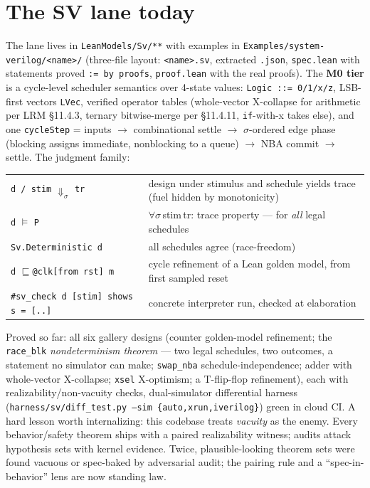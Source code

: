 \documentclass[10pt]{article}
\newcommand{\code}[1]{\texttt{#1}}
\begin{document}
\section{The SV lane today}
The lane lives in \code{LeanModels/Sv/**} with examples in
\code{Examples/system-verilog/<name>/} (three-file layout: \code{<name>.sv}, extracted
\code{.json}, \code{spec.lean} with statements proved \code{:= by proofs}, \code{proof.lean}
with the real proofs). The \textbf{M0 tier} is a cycle-level scheduler semantics over
4-state values: \code{Logic ::= 0/1/x/z}, LSB-first vectors \code{LVec}, verified operator
tables (whole-vector X-collapse for arithmetic per LRM \S11.4.3, ternary bitwise-merge per
\S11.4.11, \code{if}-with-x takes else), and one \code{cycleStep} = inputs $\to$
combinational settle $\to$ $\sigma$-ordered edge phase (blocking assigns immediate,
nonblocking to a queue) $\to$ NBA commit $\to$ settle. The judgment family:

\begin{center}\small
\begin{tabular}{@{}ll@{}}
\toprule
\code{d / stim} $\Downarrow_{\sigma}$ \code{tr} & design under stimulus and schedule yields trace (fuel hidden by monotonicity)\\
\code{d} $\vDash$ \code{P} & $\forall \sigma\,$stim$\,$tr: trace property --- for \emph{all} legal schedules\\
\code{Sv.Deterministic d} & all schedules agree (race-freedom) \\
\code{d} $\sqsubseteq$\code{@clk[from rst] m} & cycle refinement of a Lean golden model, from first sampled reset\\
\code{\#sv\_check d [stim] shows s = [..]} & concrete interpreter run, checked at elaboration \\
\bottomrule
\end{tabular}
\end{center}

Proved so far: all six gallery designs (counter golden-model refinement; the
\code{race\_blk} \emph{nondeterminism theorem} --- two legal schedules, two outcomes, a
statement no simulator can make; \code{swap\_nba} schedule-independence; adder with
whole-vector X-collapse; \code{xsel} X-optimism; a T-flip-flop refinement), each with
realizability/non-vacuity checks, dual-simulator differential harness
(\code{harness/sv/diff\_test.py --sim \{auto,xrun,iverilog\}}) green in cloud CI. A hard
lesson worth internalizing: this codebase treats \emph{vacuity} as the enemy. Every
behavior/safety theorem ships with a paired realizability witness; audits attack hypothesis
sets with kernel evidence. Twice, plausible-looking theorem sets were found vacuous or
spec-baked by adversarial audit; the pairing rule and a ``spec-in-behavior'' lens are now
standing law.
\end{document}
